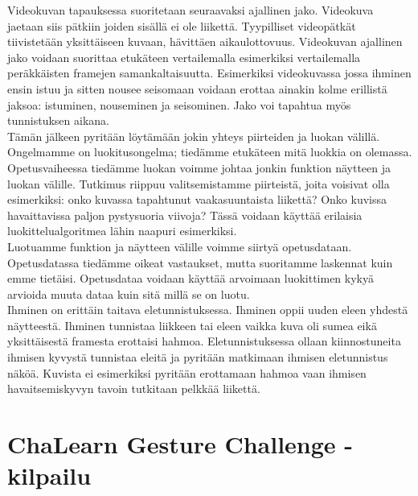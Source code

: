 Videokuvan tapauksessa suoritetaan seuraavaksi ajallinen jako. Videokuva jaetaan siis pätkiin joiden sisällä ei ole liikettä. 
Tyypilliset videopätkät tiivistetään yksittäiseen kuvaan, hävittäen aikaulottovuus. Videokuvan ajallinen jako voidaan suorittaa etukäteen
vertailemalla esimerkiksi vertailemalla peräkkäisten framejen samankaltaisuutta. Esimerkiksi videokuvassa jossa ihminen ensin istuu ja sitten nousee seisomaan
voidaan erottaa ainakin kolme erillistä jaksoa: istuminen, nouseminen ja seisominen. Jako voi tapahtua myös tunnistuksen aikana.\\

Tämän jälkeen pyritään löytämään jokin yhteys piirteiden ja luokan välillä. Ongelmamme on luokitusongelma; tiedämme etukäteen mitä luokkia on olemassa.
Opetusvaiheessa tiedämme luokan voimme johtaa jonkin funktion näytteen ja luokan välille. 
Tutkimus riippuu valitsemistamme piirteistä, joita voisivat olla esimerkiksi: onko kuvassa tapahtunut vaakasuuntaista liikettä? Onko kuvissa havaittavissa paljon pystysuoria viivoja?
Tässä voidaan käyttää erilaisia luokittelualgoritmea lähin naapuri esimerkiksi.\\

Luotuamme funktion ja näytteen välille voimme siirtyä opetusdataan. Opetusdatassa tiedämme oikeat vastaukset, mutta suoritamme laskennat kuin emme tietäisi.
Opetusdataa voidaan käyttää arvoimaan luokittimen kykyä arvioida muuta dataa kuin sitä millä se on luotu.\\

Ihminen on erittäin taitava eletunnistuksessa. Ihminen oppii uuden eleen yhdestä näytteestä. Ihminen tunnistaa liikkeen tai eleen vaikka
kuva oli sumea eikä yksittäisestä framesta erottaisi hahmoa. Eletunnistuksessa ollaan kiinnostuneita ihmisen kyvystä tunnistaa eleitä ja
pyritään matkimaan ihmisen eletunnistus näköä. Kuvista ei esimerkiksi pyritään erottamaan hahmoa vaan ihmisen havaitsemiskyvyn tavoin
tutkitaan pelkkää liikettä.\\




\section{ChaLearn Gesture Challenge -kilpailu}
\label{ChaLearn Gesture Challenge -kilpailu}

